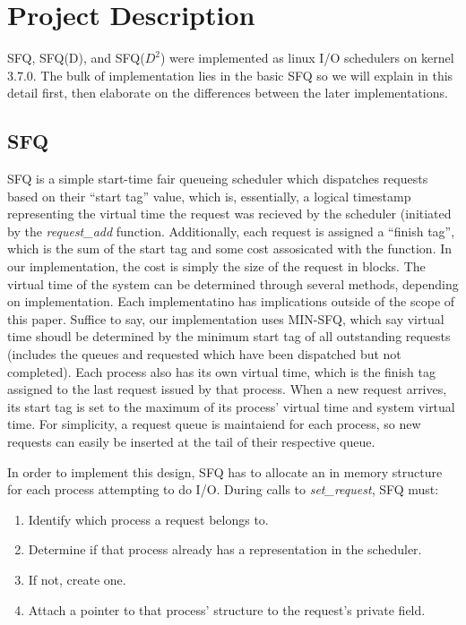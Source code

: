 \section{Project Description}

SFQ, SFQ(D), and SFQ($D^2$) were implemented as linux I/O schedulers
on kernel 3.7.0. The bulk of implementation lies in the basic SFQ so
we will explain in this detail first, then elaborate on the
differences between the later implementations. 

\subsection{SFQ}

SFQ is a simple start-time fair queueing scheduler which dispatches
requests based on their ``start tag'' value, which is, essentially, a
logical timestamp representing the virtual time the request was
recieved by the scheduler (initiated by the \emph{request\_add}
function. Additionally, each request is assigned a ``finish tag'',
which is the sum of the start tag and some cost assosicated with the
function. In our implementation, the cost is simply the size of the
request in blocks. The virtual time of the system can be determined
through several methods, depending on implementation. Each
implementatino has implications outside of the scope of this
paper. Suffice to say, our implementation uses MIN-SFQ, which say
virtual time shoudl be determined by the minimum start tag of all
outstanding requests (includes the queues and requested which have
been dispatched but not completed). Each process also has its own
virtual time, which is the finish tag assigned to the last request
issued by that process. When a new request arrives, its start tag is
set to the maximum of its process' virtual time and system virtual
time. For simplicity, a request queue is maintaiend for each process,
so new requests can easily be inserted at the tail of their respective
queue.

In order to implement this design, SFQ has to allocate an in memory
structure for each process attempting to do I/O. During calls to
\emph{set\_request}, SFQ must: 

\begin{enumerate}
\item
  Identify which process a request belongs to.
\item
  Determine if that process already has a representation in the scheduler.
\item
  If not, create one.
\item
  Attach a pointer to that process' structure to the request's private field.
\end{enumerate}

